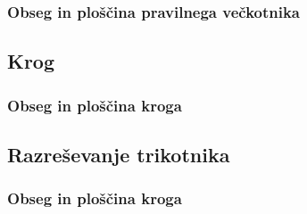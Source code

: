         \begin{frame}
            \frametitle{Obseg in ploščina pravilnega večkotnika}
        \end{frame}

        
    \subsection{Krog}

        \begin{frame}
            \frametitle{Obseg in ploščina kroga}
        \end{frame}


    \subsection{Razreševanje trikotnika}

        \begin{frame}
            \frametitle{Obseg in ploščina kroga}
        \end{frame}